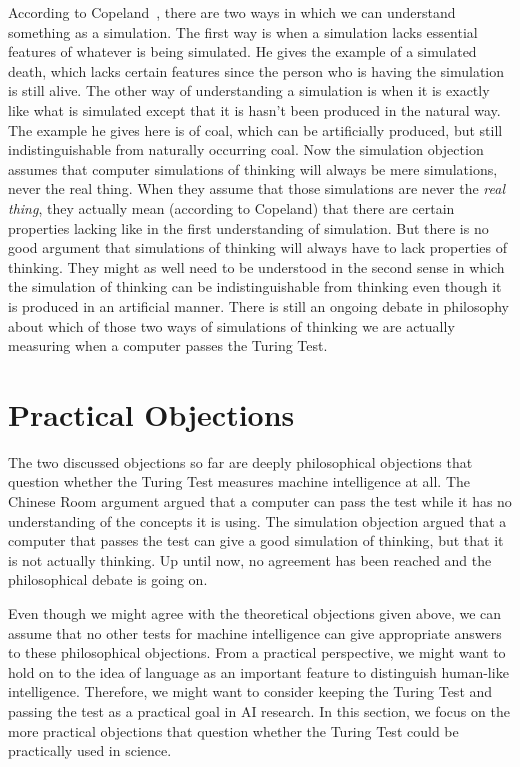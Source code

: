 According to Copeland~\cite{copeland2015artificial}, there are two ways in which we can understand something as a simulation. The first way is when a simulation lacks essential features of whatever is being simulated. He gives the example of a simulated death, which lacks certain features since the person who is having the simulation is still alive. The other way of understanding a simulation is when it is exactly like what is simulated except that it is hasn't been produced in the natural way. The example he gives here is of coal, which can be artificially produced, but still indistinguishable from naturally occurring coal.
Now the simulation objection assumes that computer simulations of thinking will always be mere simulations, never the real thing. When they assume that those simulations are never the \textit{real thing}, they actually mean (according to Copeland) that there are certain properties lacking like in the first understanding of simulation. But there is no good argument that simulations of thinking will always have to lack properties of thinking. They might as well need to be understood in the second sense in which the simulation of thinking can be indistinguishable from thinking even though it is produced in an artificial manner. There is still an ongoing debate in philosophy about which of those two ways of simulations of thinking we are actually measuring when a computer passes the Turing Test.


\section{Practical Objections}
The two discussed objections so far are deeply philosophical objections that question whether the Turing Test measures machine intelligence at all. The Chinese Room argument argued that a computer can pass the test while it has no understanding of the concepts it is using. The simulation objection argued that a computer that passes the test can give a good simulation of thinking, but that it is not actually thinking. Up until now, no agreement has been reached and the philosophical debate is going on.

Even though we might agree with the theoretical objections given above, we can assume that no other tests for machine intelligence can give appropriate answers to these philosophical objections. From a practical perspective, we might want to hold on to the idea of language as an important feature to distinguish human-like intelligence. Therefore, we might want to consider keeping the Turing Test and passing the test as a practical goal in AI research. In this section, we focus on the more practical objections that question whether the Turing Test could be practically used in science.

